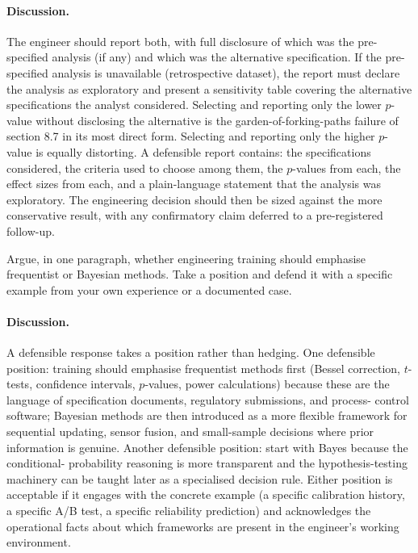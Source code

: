\paragraph{Discussion.}
The engineer should report both, with full disclosure of which was
the pre-specified analysis (if any) and which was the alternative
specification. If the pre-specified analysis is unavailable
(retrospective dataset), the report must declare the analysis as
exploratory and present a sensitivity table covering the
alternative specifications the analyst considered. Selecting and
reporting only the lower $p$-value without disclosing the
alternative is the garden-of-forking-paths failure of section 8.7
in its most direct form. Selecting and reporting only the higher
$p$-value is equally distorting. A defensible report contains: the
specifications considered, the criteria used to choose among them,
the $p$-values from each, the effect sizes from each, and a
plain-language statement that the analysis was exploratory. The
engineering decision should then be sized against the more
conservative result, with any confirmatory claim deferred to a
pre-registered follow-up.

\begin{exercise}
Argue, in one paragraph, whether engineering training should
emphasise frequentist or Bayesian methods. Take a position and
defend it with a specific example from your own experience or a
documented case.
\end{exercise}

\paragraph{Discussion.}
A defensible response takes a position rather than hedging. One
defensible position: training should emphasise frequentist methods
first (Bessel correction, $t$-tests, confidence intervals,
$p$-values, power calculations) because these are the language of
specification documents, regulatory submissions, and process-
control software; Bayesian methods are then introduced as a more
flexible framework for sequential updating, sensor fusion, and
small-sample decisions where prior information is genuine. Another
defensible position: start with Bayes because the conditional-
probability reasoning is more transparent and the
hypothesis-testing machinery can be taught later as a specialised
decision rule. Either position is acceptable if it engages with
the concrete example (a specific calibration history, a specific
A/B test, a specific reliability prediction) and acknowledges the
operational facts about which frameworks are present in the
engineer's working environment.

